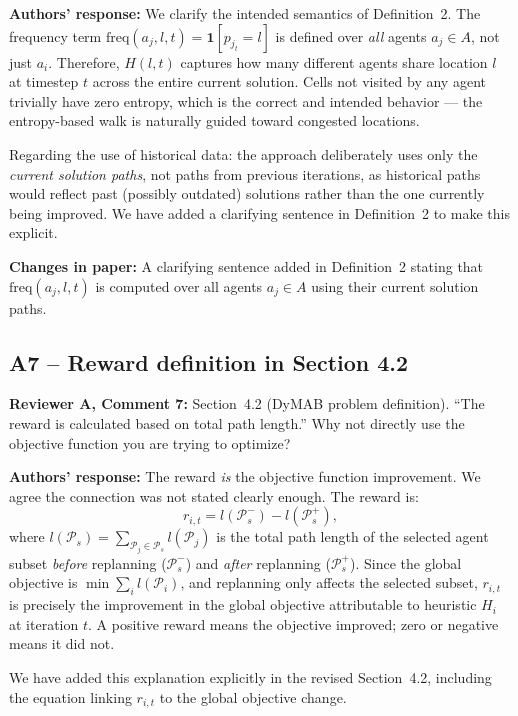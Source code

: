 \documentclass[review]{jair}
\begin{document}
\begin{authorbox}
\textbf{Authors' response:} We clarify the intended semantics of Definition~2. The frequency term $\text{freq}(a_j, l, t) = \mathbf{1}[p_{j_t} = l]$ is defined over \emph{all} agents $a_j \in A$, not just $a_i$. Therefore, $H(l, t)$ captures how many different agents share location $l$ at timestep $t$ across the entire current solution. Cells not visited by any agent trivially have zero entropy, which is the correct and intended behavior — the entropy-based walk is naturally guided toward congested locations.

Regarding the use of historical data: the approach deliberately uses only the \emph{current solution paths}, not paths from previous iterations, as historical paths would reflect past (possibly outdated) solutions rather than the one currently being improved. We have added a clarifying sentence in Definition~2 to make this explicit.
\end{authorbox}

\begin{changebox}
\textbf{Changes in paper:} A clarifying sentence added in Definition~2 stating that $\text{freq}(a_j, l, t)$ is computed over all agents $a_j \in A$ using their current solution paths.
\end{changebox}

\subsection*{A7 -- Reward definition in Section 4.2}

\begin{reviewerbox}
\textbf{Reviewer A, Comment 7:} Section~4.2 (DyMAB problem definition). ``The reward is calculated based on total path length.'' Why not directly use the objective function you are trying to optimize?
\end{reviewerbox}

\begin{authorbox}
\textbf{Authors' response:} The reward \emph{is} the objective function improvement. We agree the connection was not stated clearly enough. The reward is:
\[
r_{i,t} = l(\mathcal{P}_s^-) - l(\mathcal{P}_s^+),
\]
where $l(\mathcal{P}_s) = \sum_{\mathcal{P}_j \in \mathcal{P}_s} l(\mathcal{P}_j)$ is the total path length of the selected agent subset \emph{before} replanning ($\mathcal{P}_s^-$) and \emph{after} replanning ($\mathcal{P}_s^+$). Since the global objective is $\min \sum_i l(\mathcal{P}_i)$, and replanning only affects the selected subset, $r_{i,t}$ is precisely the improvement in the global objective attributable to heuristic $H_i$ at iteration $t$. A positive reward means the objective improved; zero or negative means it did not.

We have added this explanation explicitly in the revised Section~4.2, including the equation linking $r_{i,t}$ to the global objective change.
\end{authorbox}
\end{document}
